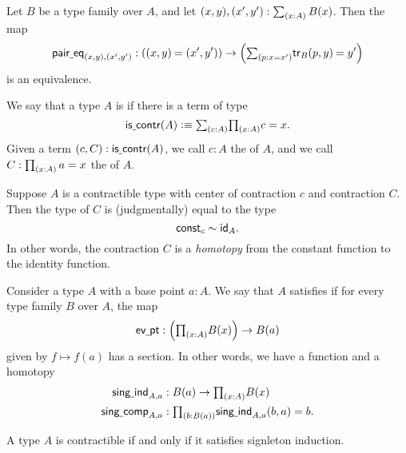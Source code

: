 \begin{cor}
Let $B$ be a type family over $A$, and let $\pairr{x,y},\pairr{x',y'}:\sm{x:A}B(x)$. Then the map
\begin{equation*}
\mathsf{pair\usc{}eq}_{(x,y),(x',y')} : (\id{\pairr{x,y}}{\pairr{x',y'}})\to \Big(\sm{p:x=x'}\id{\mathsf{tr}_B(p,y)}{y'}\Big)
\end{equation*}
is an equivalence.
\end{cor}

\begin{defn}
We say that a type $A$ is  if there is a term of type
\begin{equation*}
\iscontr(A) \defeq \sm{c:A}\prd{x:A}c=x.
\end{equation*}
Given a term $(c,C):\iscontr(A)$, we call $c:A$ the  of $A$, and we call $C:\prd{x:A}a=x$ the  of $A$.
\end{defn}

Suppose $A$ is a contractible type with center of contraction $c$ and contraction $C$. Then the type of $C$ is (judgmentally) equal to the type
\begin{equation*}
\mathsf{const}_c\htpy\idfunc[A].
\end{equation*}
In other words, the contraction $C$ is a \emph{homotopy} from the constant function to the identity function.

\begin{defn}
Consider a type $A$ with a base point $a:A$. We say that $A$ satisfies  if for every type family $B$ over $A$, the map
\begin{equation*}
\mathsf{ev\usc{}pt}:\Big(\prd{x:A}B(x)\Big)\to B(a)
\end{equation*}
given by $f\mapsto f(a)$ has a section. In other words, we have a function and a homotopy
\begin{align*}
\mathsf{sing\usc{}ind}_{A,a} & : B(a)\to \prd{x:A}B(x) \\
\mathsf{sing\usc{}comp}_{A,a} & : \prd{b:B(a)} \mathsf{sing\usc{}ind}_{A,a}(b,a)=b.
\end{align*}
\end{defn}

\begin{prp}\label{thm:contractible}
A type $A$ is contractible if and only if it satisfies signleton induction.
\end{prp}

